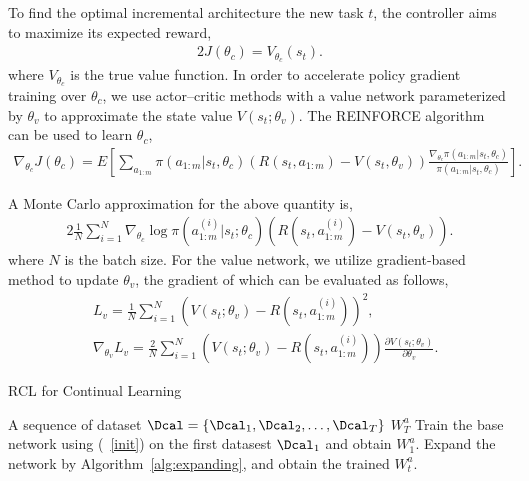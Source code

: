 \documentclass{article}
\begin{document}
To find the optimal incremental architecture the new task $t$, the controller aims  to maximize its expected reward,
\begin{alignat}{2}
J(\theta_c)=V_{\theta_c}(s_t).
\end{alignat}
where $V_{\theta_c}$ is the true value function.
 In order to accelerate policy gradient training over $\theta_c$, we use actor–critic methods with
a value network parameterized by $\theta_v$ to approximate the state value $V(s_t; \theta_v)$.   The REINFORCE algorithm~\cite{william1} can be used to learn $\theta_c$,
\begin{align}
\label{reinforce1}
\nabla_{\theta_c}J(\theta_c) = E \left[ \sum \limits_{a_{1:m}} \pi(a_{1:m}|s_t,\theta_c)(R(s_t,a_{1:m})-V(s_t,\theta_v))\frac{\nabla_{\theta_c}\pi(a_{1:m}|s_t,\theta_c)}{\pi(a_{1:m}|s_t,\theta_c)} \right].
\end{align}

A Monte Carlo approximation for the above quantity is,
\begin{alignat}{2}
\label{policy}
\frac{1}{N}\sum_{i=1}^N\nabla_{\theta_c}\log \pi(a_{1:m}^{(i)}|s_t;\theta_c)\left(R(s_t,a_{1:m}^{(i)})-V(s_t,\theta_v)\right).
\end{alignat}
where $N$ is the batch size. For the value network, we utilize  gradient-based method to update $\theta_v$, the gradient of which can be evaluated as follows,
\begin{align}
\label{valuenet}
&L_v = \frac{1}{N}\sum_{i=1}^N(V(s_t;\theta_v) - R(s_t,a^{(i)}_{1:m}))^2, \nonumber \\
&\nabla_{\theta_v} L_v = \frac{2}{N}\sum_{i=1}^N\left( V(s_t;\theta_v) - R(s_t,a^{(i)}_{1:m}) \right) \frac{\partial V(s_t;\theta_v)}{\partial \theta_v}.
\end{align}


\begin{algorithm}[tb]
  \caption{RCL for Continual Learning}
  \label{alg:rcl}
  \begin{algorithmic}[1]
     A sequence of dataset $\Dcal=\{ \Dcal_1, \Dcal_2,\dots,\Dcal_T \}$
     $W_T^a$
    \STATE Train the base network using (~\ref{init}) on the first datasest $\Dcal_1$ and obtain $W_1^a$.
    \ELSE
    \STATE Expand  the network by Algorithm~\ref{alg:expanding}, and obtain the trained  $W_t^a$.
    \ENDIF
    \ENDFOR
  \end{algorithmic}
\end{algorithm}
\end{document}
